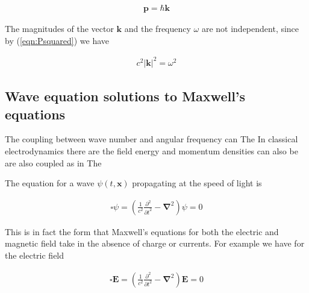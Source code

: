 \documentclass[]{eliblog}
\newcommand{\Abs}[1]{{\left\lvert{#1}\right\rvert}}
\newcommand{\BB}[0]{\mathbf{B}}
\newcommand{\BE}[0]{\mathbf{E}}
\newcommand{\Bk}[0]{\mathbf{k}}
\newcommand{\Bp}[0]{\mathbf{p}}
\newcommand{\Bx}[0]{\mathbf{x}}
\newcommand{\cross}[0]{\times}
\newcommand{\spacegrad}[0]{\boldsymbol{\nabla}}
\newcommand{\delambertian}[0]{\square}
\begin{document}
\begin{align}
\Bp = \hbar \Bk
\end{align}

The magnitudes of the vector $\Bk$ and the frequency $\omega$ are not independent, since by (\ref{eqn:Psquared}) we have

\begin{align}\label{eqn:omegaKsquared}
c^2 \Abs{\Bk}^2 = \omega^2
\end{align}

%
%
%
\subsection{Wave equation solutions to Maxwell's equations}

The coupling between wave number and angular frequency can 
The 
In classical electrodynamics there are the field energy and momentum densities can also be are also coupled as in 
The 

The equation for a wave $\psi(t,\Bx)$ propagating at the speed of light is

\begin{align}
\delambertian \psi = \left( \frac{1}{c^2}\frac{\partial^2}{{\partial t}^2} - \spacegrad^2 \right) \psi = 0
\end{align}

This is in fact the form that Maxwell's equations for both the electric and magnetic field take in the absence of charge or currents.
For example we have for the electric field

\begin{align}\label{eqn:eField}
\delambertian \BE = \left( \frac{1}{c^2}\frac{\partial^2}{{\partial t}^2} - \spacegrad^2 \right) \BE = 0
\end{align}
\end{document}
